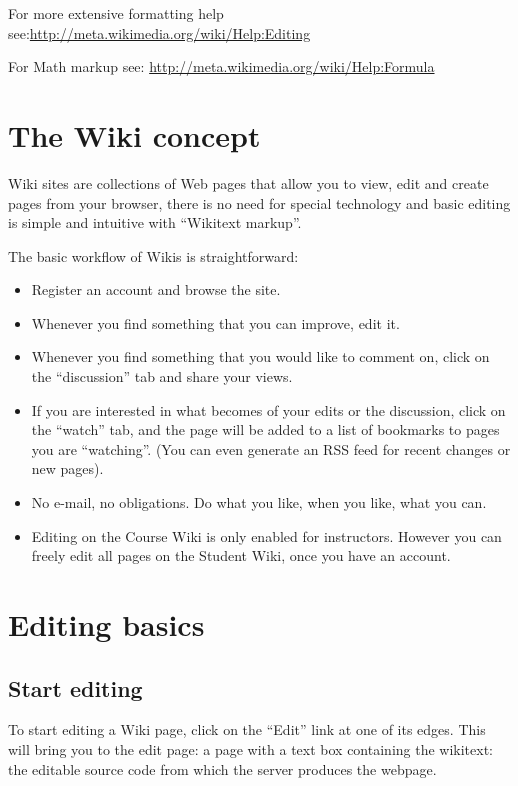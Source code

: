 \documentclass[]{book}
\providecommand{\tightlist}{%
  \setlength{\itemsep}{0pt}\setlength{\parskip}{0pt}}
\begin{document}
For more extensive formatting help
see:\url{http://meta.wikimedia.org/wiki/Help:Editing}

For Math markup see: \url{http://meta.wikimedia.org/wiki/Help:Formula}

\section{The Wiki concept}\label{the-wiki-concept}

Wiki sites are collections of Web pages that allow you to view, edit and
create pages from your browser, there is no need for special technology
and basic editing is simple and intuitive with ``Wikitext markup''.

The basic workflow of Wikis is straightforward:

\begin{itemize}
\tightlist
\item
  Register an account and browse the site.
\item
  Whenever you find something that you can improve, edit it.
\item
  Whenever you find something that you would like to comment on, click
  on the ``discussion'' tab and share your views.
\item
  If you are interested in what becomes of your edits or the discussion,
  click on the ``watch'' tab, and the page will be added to a list of
  bookmarks to pages you are ``watching''. (You can even generate an RSS
  feed for recent changes or new pages).
\item
  No e-mail, no obligations. Do what you like, when you like, what you
  can.
\item
  Editing on the Course Wiki is only enabled for instructors. However
  you can freely edit all pages on the Student Wiki, once you have an
  account.
\end{itemize}

\section{Editing basics}\label{editing-basics}

\subsection{Start editing}\label{start-editing}

To start editing a Wiki page, click on the ``Edit'' link at one of its
edges. This will bring you to the edit page: a page with a text box
containing the wikitext: the editable source code from which the server
produces the webpage.
\end{document}
